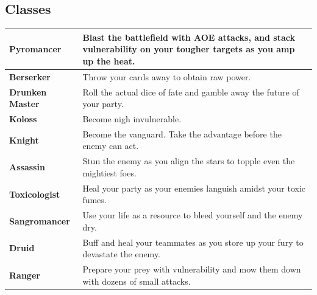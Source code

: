 \subsection*{Classes}

\begin{longtable}{|p{3.5cm}|p{12.7cm}|}
	
	
	\hline
	\textbf{Pyromancer} \symFire&  Blast the battlefield with AOE attacks, and stack vulnerability on your tougher targets as you amp up the heat.\\
	\hline
	\textbf{Berserker} \symFire \symEarth&  Throw your cards away to obtain raw power.\\
	\hline
	\textbf{Drunken Master} \symEarth&  Roll the actual dice of fate and gamble away the future of your party.\\
	\hline
	\textbf{Koloss} \symEarth \symMetal&  Become nigh invulnerable.\\
	\hline
	\textbf{Knight} \symMetal&  Become the vanguard. Take the advantage before the enemy can act.\\
	\hline
	\textbf{Assassin} \symMetal \symWater&  Stun the enemy as you align the stars to topple even the mightiest foes.\\
	\hline
	\textbf{Toxicologist} \symWater&  Heal your party as your enemies languish amidst your toxic fumes.\\
	\hline
	\textbf{Sangromancer} \symWater \symWood&  Use your life as a resource to bleed yourself and the enemy dry.\\%
	\hline
	\textbf{Druid} \symWood&  Buff and heal your teammates as you store up your fury to devastate the enemy.\\
	\hline
	\textbf{Ranger} \symWood \symFire&  Prepare your prey with vulnerability and mow them down with dozens of small attacks.\\
	\hline
\end{longtable}


